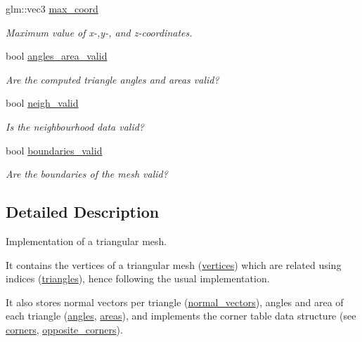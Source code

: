 \begin{DoxyCompactItemize}
\mbox{\label{classgeoproc_1_1TriangleMesh_acffb17b164f0428aa01316b0a08bc2a3}} 
glm\+::vec3 \hyperlink{classgeoproc_1_1TriangleMesh_acffb17b164f0428aa01316b0a08bc2a3}{max\+\_\+coord}
\begin{DoxyCompactList}\small\item\em Maximum value of x-\/,y-\/, and z-\/coordinates. \end{DoxyCompactList}\item 
\mbox{\label{classgeoproc_1_1TriangleMesh_a046a6679ae404e02ae40d4d4d798b6f6}} 
bool \hyperlink{classgeoproc_1_1TriangleMesh_a046a6679ae404e02ae40d4d4d798b6f6}{angles\+\_\+area\+\_\+valid}
\begin{DoxyCompactList}\small\item\em Are the computed triangle angles and areas valid? \end{DoxyCompactList}\item 
bool \hyperlink{classgeoproc_1_1TriangleMesh_a21205ec88e494f864db4d8247db70d3c}{neigh\+\_\+valid}
\begin{DoxyCompactList}\small\item\em Is the neighbourhood data valid? \end{DoxyCompactList}\item 
bool \hyperlink{classgeoproc_1_1TriangleMesh_a1384fa834aaa4ec3dc7c3b025b1ca528}{boundaries\+\_\+valid}
\begin{DoxyCompactList}\small\item\em Are the boundaries of the mesh valid? \end{DoxyCompactList}\end{DoxyCompactItemize}


\subsection{Detailed Description}
Implementation of a triangular mesh. 

It contains the vertices of a triangular mesh (\hyperlink{classgeoproc_1_1TriangleMesh_a82c3351de37daa9440f53597f080992d}{vertices}) which are related using indices (\hyperlink{classgeoproc_1_1TriangleMesh_ad1cf20622f2bb080100862f413bd89c2}{triangles}), hence following the usual implementation.

It also stores normal vectors per triangle (\hyperlink{classgeoproc_1_1TriangleMesh_ab9030a0301b2fe5868ad6c08692cce09}{normal\+\_\+vectors}), angles and area of each triangle (\hyperlink{classgeoproc_1_1TriangleMesh_ab255af87d20d76ad84246560fa3579b3}{angles}, \hyperlink{classgeoproc_1_1TriangleMesh_a684ecaaa03f1739856bba03167e51dd1}{areas}), and implements the corner table data structure (see \hyperlink{classgeoproc_1_1TriangleMesh_ab9610d614e081deb28010d237fecd55b}{corners}, \hyperlink{classgeoproc_1_1TriangleMesh_a2604795c90c694116513252b86d242b4}{opposite\+\_\+corners}).


